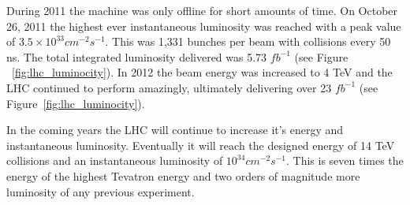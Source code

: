 During 2011 the machine was only offline for short amounts of time.  On October 26, 2011 the highest ever instantaneous luminosity was reached with a peak value of $3.5 \times 10^{33} cm^{-2} s^{-1}$.  This was 1,331 bunches per beam with collisions every 50 ns. The total integrated luminosity delivered was 5.73 $fb^{-1}$ (see Figure ~\ref{fig:lhc_luminocity}). In 2012 the beam energy was increased to 4 TeV and the LHC continued to perform amazingly, ultimately delivering over 23 $fb^{-1}$ (see Figure~\ref{fig:lhc_luminocity}).

In the coming years the LHC will continue to increase it's energy and instantaneous luminosity.  Eventually it will reach the designed energy of 14 TeV collisions and an instantaneous luminosity of $10^{34} cm^{-2}s^{-1}$.  This is seven times the energy of the highest Tevatron energy and two orders of magnitude more luminosity of any previous experiment.



